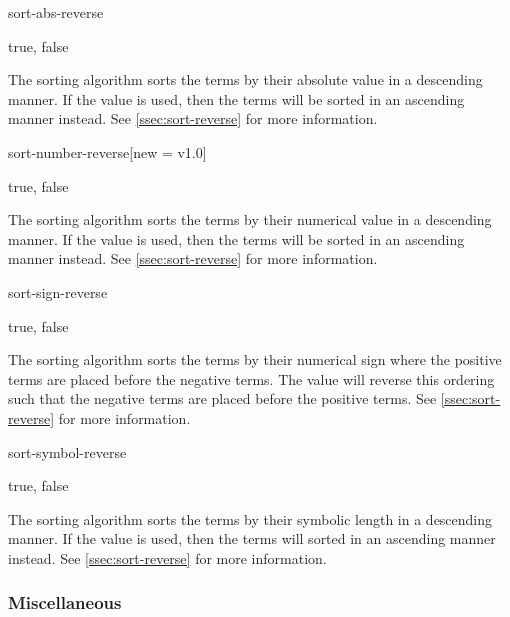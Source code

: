 	\begin{option}{sort-abs-reverse}
		\begin{values}[default = false]
			true, false
		\end{values}
		The sorting algorithm  sorts the terms by their absolute value in a descending manner. If the value  is used, then the terms will be sorted in an ascending manner instead. See \cref{ssec:sort-reverse} for more information.
	\end{option}
	
	\begin{option}{sort-number-reverse}[new = v1.0]
		\begin{values}[default = false]
			true, false
		\end{values}
		The sorting algorithm  sorts the terms by their numerical value in a descending manner. If the value  is used, then the terms will be sorted in an ascending manner instead. See \cref{ssec:sort-reverse} for more information.
	\end{option}
	
	\begin{option}{sort-sign-reverse}
		\begin{values}[default = false]
			true, false
		\end{values}
		The sorting algorithm  sorts the terms by their numerical sign where the positive terms are placed before the negative terms. The value  will reverse this ordering such that the negative terms are placed before the positive terms. See \cref{ssec:sort-reverse} for more information.
	\end{option}
	
	\begin{option}{sort-symbol-reverse}
		\begin{values}[default = false]
			true, false
		\end{values}
		The sorting algorithm  sorts the terms by their symbolic length in a descending manner. If the value  is used, then the terms will sorted in an ascending manner instead. See \cref{ssec:sort-reverse} for more information.
	\end{option}
	
	\clearpage
	
	\subsubsection*{Miscellaneous}
	
